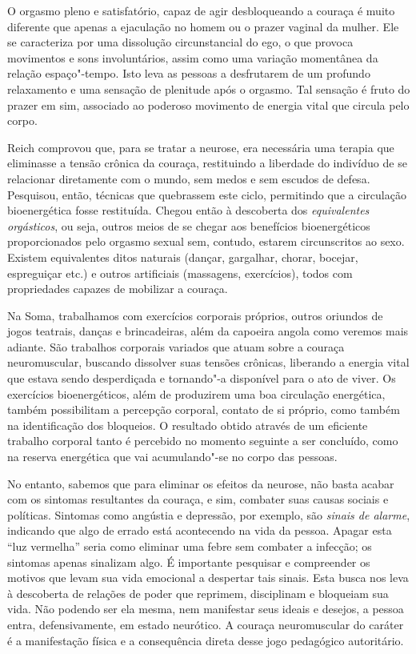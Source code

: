O orgasmo pleno e satisfatório, capaz de agir desbloqueando a couraça é
muito diferente que apenas a ejaculação no homem ou o prazer vaginal da
mulher. Ele se caracteriza por uma dissolução circunstancial do ego, o
que provoca movimentos e sons involuntários, assim como uma variação
momentânea da relação espaço"-tempo. Isto leva as pessoas a desfrutarem
de um profundo relaxamento e uma sensação de plenitude após o orgasmo.
Tal sensação é fruto do prazer em sim, associado ao poderoso movimento
de energia vital que circula pelo corpo.

Reich comprovou que, para se tratar a neurose, era necessária uma
terapia que eliminasse a tensão crônica da couraça, restituindo a
liberdade do indivíduo de se relacionar diretamente com o mundo, sem
medos e sem escudos de defesa. Pesquisou, então, técnicas que quebrassem
este ciclo, permitindo que a circulação bioenergética fosse restituída.
Chegou então à descoberta dos \emph{equivalentes orgásticos}, ou seja,
outros meios de se chegar aos benefícios bioenergéticos proporcionados
pelo orgasmo sexual sem, contudo, estarem circunscritos ao sexo. Existem
equivalentes ditos naturais (dançar, gargalhar, chorar, bocejar,
espreguiçar etc.) e outros artificiais (massagens, exercícios), todos
com propriedades capazes de mobilizar a couraça.

Na Soma, trabalhamos com exercícios corporais próprios, outros oriundos
de jogos teatrais, danças e brincadeiras, além da capoeira angola como
veremos mais adiante. São trabalhos corporais variados que atuam sobre a
couraça neuromuscular, buscando dissolver suas tensões crônicas,
liberando a energia vital que estava sendo desperdiçada e tornando"-a
disponível para o ato de viver. Os exercícios bioenergéticos, além de
produzirem uma boa circulação energética, também possibilitam a
percepção corporal, contato de si próprio, como também na identificação
dos bloqueios. O resultado obtido através de um eficiente trabalho
corporal tanto é percebido no momento seguinte a ser concluído, como na
reserva energética que vai acumulando"-se no corpo das pessoas.

No entanto, sabemos que para eliminar os efeitos da neurose, não basta
acabar com os sintomas resultantes da couraça, e sim, combater suas
causas sociais e políticas. Sintomas como angústia e depressão, por
exemplo, são \emph{sinais de alarme}, indicando que algo de errado está
acontecendo na vida da pessoa. Apagar esta ``luz vermelha'' seria como
eliminar uma febre sem combater a infecção; os sintomas apenas sinalizam
algo. É importante pesquisar e compreender os motivos que levam sua vida
emocional a despertar tais sinais. Esta busca nos leva à descoberta de
relações de poder que reprimem, disciplinam e bloqueiam sua vida. Não
podendo ser ela mesma, nem manifestar seus ideais e desejos, a pessoa
entra, defensivamente, em estado neurótico. A couraça neuromuscular do
caráter é a manifestação física e a consequência direta desse jogo
pedagógico autoritário.

